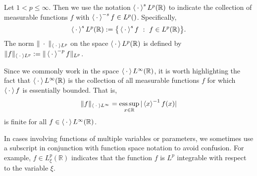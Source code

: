 \documentclass[../dissertation.tex]{subfiles}
\begin{document}
\begin{defn}\label{defn2:wLp}
	Let $1 < p \leq \infty$. Then we use the notation 
	$\left\langle \kern 0.5ex \cdot \kern 0.5ex \right\rangle^s L^p(\mathbb R)$
	to indicate the collection of measurable functions $f$ with 
	$\left\langle \kern 0.5ex \cdot \kern 0.5ex \right\rangle^{-s} f \in L^p(\mathbb)$. Specifically, 
	\[
		\left\langle \kern 0.5ex \cdot \kern 0.5ex \right\rangle^s L^p(\mathbb R) 
			:= \big\{ \left\langle \kern 0.5ex \cdot \kern 0.5ex \right\rangle^s f ~:~ f \in L^p(\mathbb R) \big\}.
	\]
	The norm $\| \kern 0.5ex \cdot \kern 0.5ex \|_{\left\langle \kern 0.5ex \cdot \kern 0.5ex \right\rangle L^p}$ on the space 
	$\left\langle \kern 0.5ex \cdot \kern 0.5ex \right\rangle L^p(\mathbb R)$ is defined by 
	$\| f \|_{\left\langle \kern 0.5ex \cdot \kern 0.5ex \right\rangle L^p}:= \| \left\langle \kern 0.5ex \cdot \kern 0.5ex \right\rangle^{-p} f \|_{L^p}$.
\end{defn}

\begin{rmk}
	Since we commonly work in the space $\left\langle \kern 0.5ex \cdot \kern 0.5ex \right\rangle L^\infty(\mathbb R)$, 
	it is worth highlighting the fact that $\left\langle \kern 0.5ex \cdot \kern 0.5ex \right\rangle L^\infty(\mathbb R)$
	is the collection of all measurable functions $f$ for which
	$\left\langle \kern 0.5ex \cdot \kern 0.5ex \right\rangle f$ is essentially bounded. That is,
	\[
		\| f \|_{\left\langle \kern 0.5ex \cdot \kern 0.5ex \right\rangle L^\infty} 
			= \operatorname*{ess\,sup}_{x\in \mathbb R} | \left\langle x \right\rangle^{-1} f(x) |
	\]
	is finite for all $f \in \left\langle \kern 0.5ex \cdot \kern 0.5ex \right\rangle L^\infty(\mathbb R)$.
\end{rmk}

\begin{rmk}
	In cases involving functions of multiple variables or parameters, we 
	sometimes use a subscript in conjunction with function space notation 
	to avoid confusion. For example, $f \in L_\xi^p(\mathbb R)$ indicates 
	that the function $f$ is $L^p$ integrable with respect to the variable
	$\xi$.\label{sym2:Lpxi}
\end{rmk}
\end{document}
